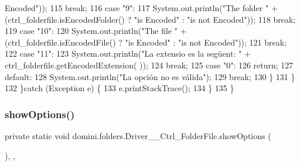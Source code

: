 \begin{DoxyCode}
{       Encoded"}));
115                 \textcolor{keywordflow}{break};
116                 \textcolor{keywordflow}{case} \textcolor{stringliteral}{"9"}:
117                     System.out.println(\textcolor{stringliteral}{"The folder "} + (ctrl\_folderfile.isEncodedFolder() ? \textcolor{stringliteral}{"is Encoded"} : \textcolor{stringliteral}{
      "is not Encoded"}));
118                 \textcolor{keywordflow}{break};
119                 \textcolor{keywordflow}{case} \textcolor{stringliteral}{"10"}:
120                     System.out.println(\textcolor{stringliteral}{"The file "} + (ctrl\_folderfile.isEncodedFile() ? \textcolor{stringliteral}{"is Encoded"} : \textcolor{stringliteral}{"is
       not Encoded"}));
121                 \textcolor{keywordflow}{break};
122                 \textcolor{keywordflow}{case} \textcolor{stringliteral}{"11"}:
123                     System.out.println(\textcolor{stringliteral}{"La extensio es la següent: "} + ctrl\_folderfile.getEncodedExtension(
      ));
124                 \textcolor{keywordflow}{break};
125                 \textcolor{keywordflow}{case} \textcolor{stringliteral}{"0"}:
126                     \textcolor{keywordflow}{return};
127                 \textcolor{keywordflow}{default}:
128                     System.out.println(\textcolor{stringliteral}{"La opción no es válida"});
129                 \textcolor{keywordflow}{break};
130             \}
131         \}
132     \}\textcolor{keywordflow}{catch} (Exception e) \{
133         e.printStackTrace();
134     \}
135     \}
\end{DoxyCode}
\mbox{\label{classdomini_1_1folders_1_1Driver____Ctrl__FolderFile_a5343134690950988d119d5e124edb1b4}} 
\subsubsection{\texorpdfstring{show\+Options()}{showOptions()}}
{\footnotesize\ttfamily private static void domini.\+folders.\+Driver\+\_\+\+\_\+\+Ctrl\+\_\+\+Folder\+File.\+show\+Options (\begin{DoxyParamCaption}{ }\end{DoxyParamCaption})\hspace{0.3cm}{\ttfamily [inline]}, {\ttfamily [static]}, {\ttfamily [private]}}



